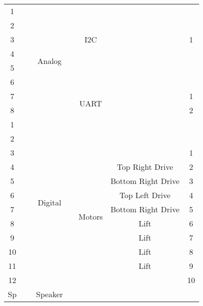 \begin{center}
\begin{tabular}{| c | c | c | c | c | c | c |}
\hline
1 & ~ %
& \multirow{8}{*}{Analog} & \multicolumn{4}{|c|}{\cellcolor{gray}}\\ \cline{1-2}\cline{4-5}\cline{6-7}
2 & ~ %
& & \multicolumn{4}{|c|}{\cellcolor{gray}}\\ \cline{1-2}\cline{4-5}\cline{6-7}
3 & ~ %
& & \cellcolor{gray} & I2C
  & %
& 1\\ \cline{1-2}\cline{4-5}\cline{6-7}
4 & ~ %
& & \multicolumn{4}{|c|}{\cellcolor{gray}}\\ \cline{1-2}\cline{4-5}\cline{6-7}
5 & ~ %
& & \multicolumn{4}{|c|}{\cellcolor{gray}}\\ \cline{1-2}\cline{4-5}\cline{6-7}
6 & ~ %
& & \multicolumn{4}{|c|}{\cellcolor{gray}}\\ \cline{1-2}\cline{4-5}\cline{6-7}
7 & ~ %
& & \cellcolor{gray} & \multirow{2}{*}{UART}
  & ~ %
& 1\\ \cline{1-2}\cline{4-4}\cline{6-7}
8 & ~ %
& & \cellcolor{gray} &
  & ~ %
& 2\\ \cline{1-3}\cline{4-5}\cline{6-7}
1 & ~ %
& \multirow{12}{*}{Digital} & \multicolumn{4}{|c|}{\cellcolor{gray}}\\ \cline{1-2}\cline{4-5}\cline{6-7}
2 & ~ %
& & \multicolumn{4}{|c|}{\cellcolor{gray}}\\ \cline{1-2}\cline{4-5}\cline{6-7}
3 & ~ %
& & \cellcolor{gray} & \multirow{10}{*}{Motors}
  & ~ %
& 1\\  \cline{1-2}\cline{4-4}\cline{6-7}
4 & ~ %
& & \cellcolor{gray} &
  & Top Right Drive %
& 2\\ \cline{1-2}\cline{4-4}\cline{6-7}
5 & ~ %
& & \cellcolor{gray} & ~
  & Bottom Right Drive %
& 3\\ \cline{1-2}\cline{4-4}\cline{6-7}
6 & ~ %
& & \cellcolor{gray} & ~
  & Top Left Drive %
& 4\\ \cline{1-2}\cline{4-4}\cline{6-7}
7 & ~ %
& & \cellcolor{gray} & ~
  & Bottom Right Drive %
& 5\\ \cline{1-2}\cline{4-4}\cline{6-7}
8 & ~ %
& & \cellcolor{gray} & ~
  & Lift %
& 6\\ \cline{1-2}\cline{4-4}\cline{6-7}
9 & ~ %
& & \cellcolor{gray} & ~
  & Lift %
& 7\\ \cline{1-2}\cline{4-4}\cline{6-7}
10 & ~ %
& & \cellcolor{gray} & ~
   & Lift %
& 8\\ \cline{1-2}\cline{4-4}\cline{6-7}
11 & ~ %
& & \cellcolor{gray} & ~
   & Lift %
& 9\\ \cline{1-2}\cline{4-4}\cline{6-7}
12 & ~ %
& & \cellcolor{gray} & ~
   & ~ %
& 10\\ \cline{1-3}\cline{4-5}\cline{6-7}
Sp & ~ %
& Speaker & \multicolumn{4}{|c|}{\cellcolor{gray}}\\
\hline
\end{tabular}
\end{center}

